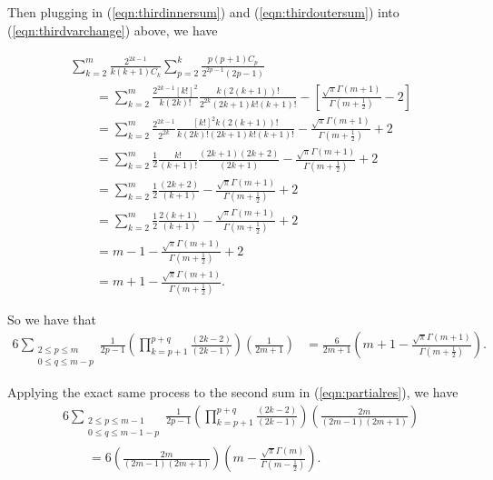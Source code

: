 \documentclass[11pt]{article}
\theoremstyle{definition}
\theoremstyle{definition}
\theoremstyle{plain}
\theoremstyle{plain}
\theoremstyle{plain}
\theoremstyle{definition}
\theoremstyle{definition}
\begin{document}
{Then plugging in (\ref{eqn:thirdinnersum}) and (\ref{eqn:thirdoutersum}) into (\ref{eqn:thirdvarchange}) above, we have

\begin{equation}
\begin{aligned}
&\sum\limits_{k=2}^m\frac{2^{2k-1}}{k(k+1)C_k}\sum\limits_{p=2}^k\frac{p(p+1)C_p}{2^{2p-1}(2p-1)} \\
&\qquad = \sum\limits_{k=2}^m\frac{2^{2k-1}[k!]^2}{k(2k)!}\frac{k(2(k+1))!}{2^{2k}(2k+1)k!(k+1)!} - \left[\frac{\sqrt{\pi}\Gamma(m+1)}{\Gamma(m+\frac{1}{2})}-2\right] \\
&\qquad = \sum\limits_{k=2}^m\frac{2^{2k-1}}{2^{2k}}\frac{[k!]^2k(2(k+1))!}{k(2k)!(2k+1)k!(k+1)!} - \frac{\sqrt{\pi}\Gamma(m+1)}{\Gamma(m+\frac{1}{2})} + 2 \\
&\qquad = \sum\limits_{k=2}^m \frac{1}{2}\frac{k!}{(k+1)!}\frac{(2k+1)(2k+2)}{(2k+1)} -\frac{\sqrt{\pi}\Gamma(m+1)}{\Gamma(m+\frac{1}{2})} + 2 \\
&\qquad = \sum\limits_{k=2}^m \frac{1}{2}\frac{(2k+2)}{(k+1)} - \frac{\sqrt{\pi}\Gamma(m+1)}{\Gamma(m+\frac{1}{2})} + 2 \\
&\qquad = \sum\limits_{k=2}^m \frac{1}{2}\frac{2(k+1)}{(k+1)}  - \frac{\sqrt{\pi}\Gamma(m+1)}{\Gamma(m+\frac{1}{2})} + 2 \\
&\qquad = m - 1 - \frac{\sqrt{\pi}\Gamma(m+1)}{\Gamma(m+\frac{1}{2})} + 2 \\
&\qquad = m + 1 - \frac{\sqrt{\pi}\Gamma(m+1)}{\Gamma(m+\frac{1}{2})}.
\end{aligned}
\end{equation}

So we have that 
\begin{equation}\label{eqn:thirdsimp}
\begin{aligned}
6\sum\limits_{\substack{2 \leq p \leq m \\ 0 \leq q \leq m - p}} \frac{1}{2p-1}\left(\prod\limits_{k=p+1}^{p+q}\frac{(2k-2)}{(2k-1)}\right)\left(\frac{1}{2m+1}\right) &= \frac{6}{2m+1}\left(m + 1 -\frac{\sqrt{\pi}\Gamma(m+1)}{\Gamma(m+\frac{1}{2})}\right).
\end{aligned}
\end{equation}

Applying the exact same process to the second sum in (\ref{eqn:partialres}), we have
\begin{equation}\label{eqn:secondsimp}
\begin{aligned}
&6\sum\limits_{\substack{2\leq p \leq m -1 \\ 0 \leq q \leq m - 1 - p}}\frac{1}{2p-1}\left(\prod\limits_{k=p+1}^{p+q}\frac{(2k-2)}{(2k-1)}\right)\left(\frac{2m}{(2m-1)(2m+1)}\right) \\
&\qquad = 6\left(\frac{2m}{(2m-1)(2m+1)}\right)\left(m-\frac{\sqrt{\pi}\Gamma(m)}{\Gamma(m-\frac{1}{2})}\right).
\end{aligned}
\end{equation}

}
\end{document}
